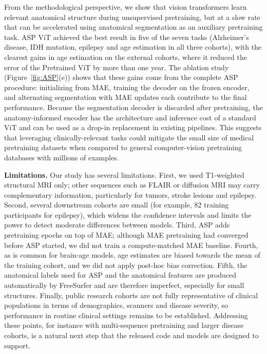 \documentclass[pdflatex,sn-nature]{sn-jnl}%
\newif\ifhighlight
\newcommand{\rev}[1]{\ifhighlight{\color{blue}{}#1}\else#1\fi}%
\newcommand{\revdel}[1]{\ifhighlight{\color{red}\sout{#1}}\fi}
\theoremstyle{thmstyleone}%
\theoremstyle{thmstyletwo}%
\theoremstyle{thmstylethree}%
\begin{document}
From the methodological perspective, we show that vision transformers learn relevant anatomical structure during unsupervised pretraining, but at a slow rate that can be \revdel{greatly }accelerated using anatomical segmentation as an auxiliary pretraining task. \rev{ASP ViT achieved the best result in five of the seven tasks (Alzheimer's disease, IDH mutation, epilepsy and age estimation in all three cohorts), with the clearest gains in age estimation on the external cohorts, where it reduced the error of the Pretrained ViT by more than one year. The ablation study (Figure~\ref{fig:ASP}(e)) shows that these gains come from the complete ASP procedure: initializing from MAE, training the decoder on the frozen encoder, and alternating segmentation with MAE updates each contribute to the final performance. Because the segmentation decoder is discarded after pretraining, the anatomy-informed encoder has the architecture and inference cost of a standard ViT and can be used as a drop-in replacement in existing pipelines.} This suggests that leveraging clinically-relevant tasks could mitigate the small size of medical pretraining datasets when compared to general computer-vision pretraining databases with millions of examples. 

\rev{\textbf{Limitations.} Our study has several limitations. First, we used T1-weighted structural MRI only; other sequences such as FLAIR or diffusion MRI may carry complementary information, particularly for tumors, stroke lesions and epilepsy. Second, several downstream cohorts are small (for example, 82 training participants for epilepsy), which widens the confidence intervals and limits the power to detect moderate differences between models. Third, ASP adds pretraining epochs on top of MAE; although MAE pretraining had converged before ASP started, we did not train a compute-matched MAE baseline. Fourth, as is common for brain-age models, age estimates are biased towards the mean of the training cohort, and we did not apply post-hoc bias correction. Fifth, the anatomical labels used for ASP and the anatomical features are produced automatically by FreeSurfer and are therefore imperfect, especially for small structures. Finally, public research cohorts are not fully representative of clinical populations in terms of demographics, scanners and disease severity, so performance in routine clinical settings remains to be established. Addressing these points, for instance with multi-sequence pretraining and larger disease cohorts, is a natural next step that the released code and models are designed to support.}
\end{document}
